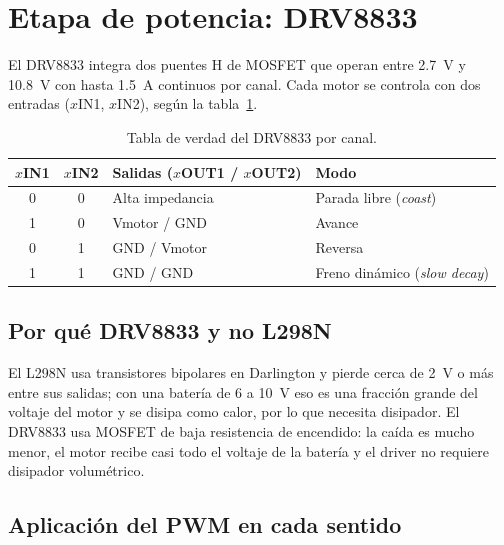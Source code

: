 \section{Etapa de potencia: DRV8833}
\label{sec:potencia}

El DRV8833 integra dos puentes H de MOSFET que operan entre \SI{2.7}{\volt} y
\SI{10.8}{\volt} con hasta \SI{1.5}{\ampere} continuos por canal. Cada motor
se controla con dos entradas ($x$IN1, $x$IN2), según la tabla~\ref{tab:drv}.

\begin{table}[H]
  \centering
  \caption{Tabla de verdad del DRV8833 por canal.}
  \label{tab:drv}
  \begin{tabular}{@{}c c l l@{}}
    \toprule
    \textbf{$x$IN1} & \textbf{$x$IN2} & \textbf{Salidas ($x$OUT1 / $x$OUT2)} & \textbf{Modo} \\
    \midrule
    0 & 0 & Alta impedancia & Parada libre (\emph{coast}) \\
    1 & 0 & Vmotor / GND    & Avance \\
    0 & 1 & GND / Vmotor    & Reversa \\
    1 & 1 & GND / GND       & Freno dinámico (\emph{slow decay}) \\
    \bottomrule
  \end{tabular}
\end{table}

\subsection{Por qué DRV8833 y no L298N}

El L298N usa transistores bipolares en Darlington y pierde cerca de
\SI{2}{\volt} o más entre sus salidas; con una batería de 6 a \SI{10}{\volt}
eso es una fracción grande del voltaje del motor y se disipa como calor, por lo
que necesita disipador. El DRV8833 usa MOSFET de baja resistencia de
encendido: la caída es mucho menor, el motor recibe casi todo el voltaje de la
batería y el driver no requiere disipador volumétrico.

\subsection{Aplicación del PWM en cada sentido}

